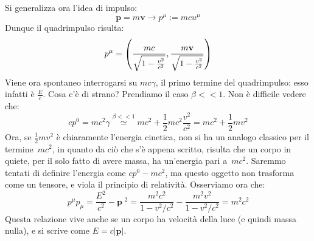 \begin{definizione}[Il quadrimpulso]
Si generalizza ora l'idea di impulso:
\begin{equation}
 \mathbf{p}=m\mathbf{v}\rightarrow p^{\mu}:=mcu^{\mu}
\end{equation}
Dunque il quadrimpulso risulta:
\begin{equation}
 p^{\mu} = 
  \left(\frac{mc}{\sqrt{1-\frac{v^{2}}{c^{2}}}},\frac{m\mathbf{v}}{\sqrt{1-\frac{v^{2}}{c^{2}}}}\right)\label{eq:quadrimpulso}
\end{equation}
Viene ora spontaneo interrogarsi su $mc\gamma$, il primo termine
del quadrimpulso: esso infatti \`e $\frac{E}{c}$. Cosa c'\`e di
strano? Prendiamo il caso $\beta<<1$. Non \`e
dif\mbox{}f\mbox{}icile vedere che:
\begin{equation}
 cp^0=mc^2\gamma \stackrel{\beta<<1}{\simeq}mc^2+\frac{1}{2}mc^2
\frac{v^2}{c^2}=mc^2+\frac{1}{2}mv^2
\end{equation}
Ora, se $\frac{1}{2}mv^2$ \`e chiaramente l'energia cinetica, non
si ha un analogo classico per il termine~$mc^2$,
in quanto da ci\`o che s'\`e appena
scritto, risulta che un corpo in quiete, per il solo fatto di
avere massa, ha un'energia pari a~$mc^2$. Saremmo tentati di
definire l'energia come $cp^0-mc^2$, ma questo oggetto non
trasforma come un tensore, e viola il principio di relativit\`a.
Osserviamo ora che:
\begin{equation}
p^{\mu}p_{\mu}=\frac{E^2}{c^2}-\mathbf{p}\;{}^{2} =
\frac{m^2c^2}{1-v^2/c^2}-\frac{m^2v^2}{1-v^2/c^2}=m^2c^2
\label{eq:masshell}\end{equation}
Questa relazione vive anche se un corpo ha velocit\`a della luce
(e quindi massa nulla), e si scrive come $E=c|\mathbf{p}|$.
\end{definizione}
